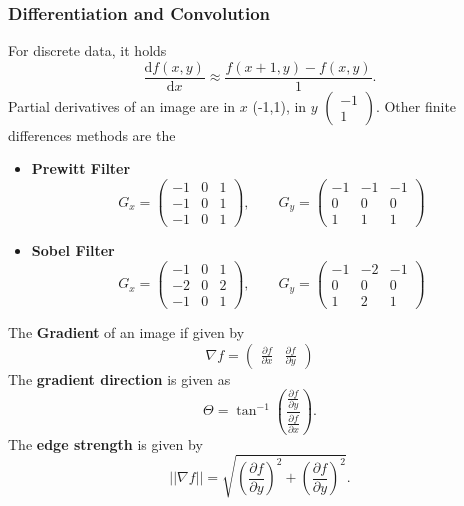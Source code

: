 \documentclass[a4paper,12 pt]{article}
\theoremstyle{definition}
\theoremstyle{remark}
\theoremstyle{definition}
\theoremstyle{definition}
\theoremstyle{definition}
\theoremstyle{remark}
\theoremstyle{definition}
\begin{document}
\subsubsection*{Differentiation and Convolution}
For discrete data, it holds
\begin{equation}
\frac{\text{d}f(x,y)}{\text{d}x}\approx \frac{f(x+1,y)-f(x,y)}{1}.
\end{equation}
Partial derivatives of an image are in $x$ (-1,1), in $y$ $\begin{pmatrix} -1\\1 \end{pmatrix}$. Other finite differences methods are the 
\begin{itemize}
\item \textbf{Prewitt Filter}
\begin{equation}
G_x=\begin{pmatrix} 
-1&0&1\\
-1&0&1\\
-1&0&1
\end{pmatrix}, \qquad G_y=\begin{pmatrix} 
-1&-1&-1\\
0&0&0\\
1&1&1
\end{pmatrix}
\end{equation}
\item \textbf{Sobel Filter}
\begin{equation}
G_x=\begin{pmatrix} 
-1&0&1\\
-2&0&2\\
-1&0&1
\end{pmatrix}, \qquad G_y=\begin{pmatrix} 
-1&-2&-1\\
0&0&0\\
1&2&1
\end{pmatrix}
\end{equation}
\end{itemize}
The \textbf{Gradient} of an image if given by 
\begin{equation}
\nabla f=\begin{pmatrix} 
\frac{\partial f}{\partial x}&\frac{\partial f}{\partial y}
\end{pmatrix}
\end{equation}
The \textbf{gradient direction} is given as
\begin{equation}
\Theta = \tan^{-1}\left( \frac{\frac{\partial f}{\partial y}}{\frac{\partial f}{\partial x}}\right).
\end{equation}
The \textbf{edge strength} is given by
\begin{equation}
||\nabla f||=\sqrt{(\frac{\partial f}{\partial y})^2+(\frac{\partial f}{\partial y})^2}.
\end{equation}
\end{document}
